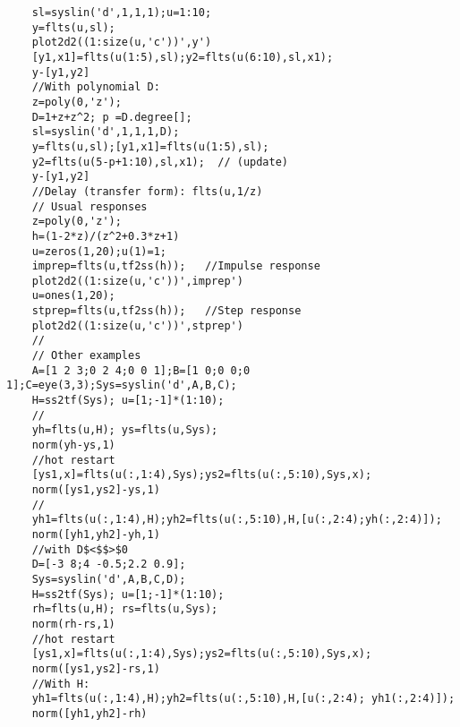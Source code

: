\begin{examples}
  \begin{Verbatim}
    sl=syslin('d',1,1,1);u=1:10;
    y=flts(u,sl); 
    plot2d2((1:size(u,'c'))',y')
    [y1,x1]=flts(u(1:5),sl);y2=flts(u(6:10),sl,x1);
    y-[y1,y2]
    //With polynomial D:
    z=poly(0,'z');
    D=1+z+z^2; p =D.degree[];
    sl=syslin('d',1,1,1,D);
    y=flts(u,sl);[y1,x1]=flts(u(1:5),sl);
    y2=flts(u(5-p+1:10),sl,x1);  // (update)
    y-[y1,y2]
    //Delay (transfer form): flts(u,1/z)
    // Usual responses
    z=poly(0,'z');
    h=(1-2*z)/(z^2+0.3*z+1)
    u=zeros(1,20);u(1)=1;
    imprep=flts(u,tf2ss(h));   //Impulse response
    plot2d2((1:size(u,'c'))',imprep')
    u=ones(1,20);
    stprep=flts(u,tf2ss(h));   //Step response
    plot2d2((1:size(u,'c'))',stprep')
    //
    // Other examples
    A=[1 2 3;0 2 4;0 0 1];B=[1 0;0 0;0 1];C=eye(3,3);Sys=syslin('d',A,B,C);
    H=ss2tf(Sys); u=[1;-1]*(1:10);
    //
    yh=flts(u,H); ys=flts(u,Sys);
    norm(yh-ys,1)    
    //hot restart
    [ys1,x]=flts(u(:,1:4),Sys);ys2=flts(u(:,5:10),Sys,x);
    norm([ys1,ys2]-ys,1)
    //
    yh1=flts(u(:,1:4),H);yh2=flts(u(:,5:10),H,[u(:,2:4);yh(:,2:4)]);
    norm([yh1,yh2]-yh,1)
    //with D$<$$>$0
    D=[-3 8;4 -0.5;2.2 0.9];
    Sys=syslin('d',A,B,C,D);
    H=ss2tf(Sys); u=[1;-1]*(1:10);
    rh=flts(u,H); rs=flts(u,Sys);
    norm(rh-rs,1)
    //hot restart
    [ys1,x]=flts(u(:,1:4),Sys);ys2=flts(u(:,5:10),Sys,x);
    norm([ys1,ys2]-rs,1)
    //With H:
    yh1=flts(u(:,1:4),H);yh2=flts(u(:,5:10),H,[u(:,2:4); yh1(:,2:4)]);
    norm([yh1,yh2]-rh)
  \end{Verbatim}
\end{examples}
\begin{manseealso}
      
\end{manseealso}
